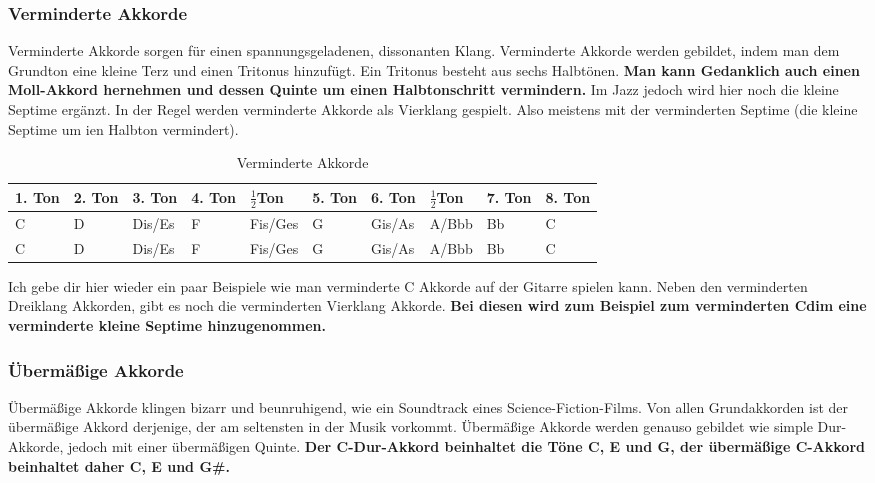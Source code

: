 \subsubsection{Verminderte Akkorde}
Verminderte Akkorde sorgen für einen spannungsgeladenen, dissonanten Klang. Verminderte Akkorde werden gebildet, indem man dem Grundton eine kleine Terz und einen Tritonus hinzufügt. Ein Tritonus besteht aus sechs Halbtönen. \textbf{Man kann Gedanklich auch einen Moll-Akkord hernehmen und dessen Quinte um einen Halbtonschritt vermindern.} Im Jazz jedoch wird hier noch die kleine Septime ergänzt. In der Regel werden verminderte Akkorde als Vierklang gespielt. Also meistens mit der verminderten Septime (die kleine Septime um ien Halbton vermindert). 

\begin{table}[H]
    \caption{Verminderte Akkorde}
    \scriptsize
    \begin{tabularx}{\textwidth}{|X|X|p{1.4cm}|X|p{1.4cm}|X|p{1.4cm}|p{1.4cm}|X|X|}
    \hline
    1. Ton & 2. Ton & 3. Ton & 4. Ton & $\frac{1}{2}$Ton & 5. Ton & 6. Ton & $\frac{1}{2}$Ton & 7. Ton & 8. Ton \\ \hline
    \cellcolor{gray!25}C & D & \cellcolor{gray!25}Dis/Es & F & \cellcolor{gray!25}Fis/Ges & G & Gis/As & A/Bbb & Bb & C \\ \hline  
    \cellcolor{gray!25}C & D & \cellcolor{gray!25}Dis/Es & F & \cellcolor{gray!25}Fis/Ges & G & Gis/As & \cellcolor{gray!25}A/Bbb & Bb & C \\ \hline  
    \end{tabularx}
\end{table}

Ich gebe dir hier wieder ein paar Beispiele wie man verminderte C Akkorde auf der Gitarre spielen kann. Neben den verminderten Dreiklang Akkorden, gibt es noch die verminderten Vierklang Akkorde. \textbf{Bei diesen wird zum Beispiel zum verminderten Cdim eine verminderte kleine Septime hinzugenommen.}




\subsubsection{Übermäßige Akkorde}
Übermäßige Akkorde klingen bizarr und beunruhigend, wie ein Soundtrack eines Science-Fiction-Films. Von allen Grundakkorden ist der übermäßige Akkord derjenige, der am seltensten in der Musik vorkommt. Übermäßige Akkorde werden genauso gebildet wie simple Dur-Akkorde, jedoch mit einer übermäßigen Quinte. \textbf{Der C-Dur-Akkord beinhaltet die Töne C, E und G, der übermäßige C-Akkord beinhaltet daher C, E und G\#.}

